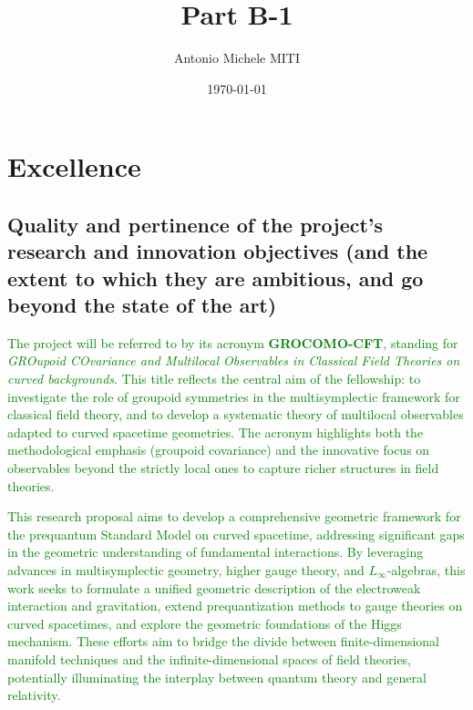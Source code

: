 \documentclass[11pt,draftproposal]{msca-pf}
\title{Part B-1}
\author{Antonio Michele MITI}
\date{\today}
\begin{document}
\maketitle

\section{Excellence }
\label{sc:excellence}


\subsection{Quality and pertinence of the project's research and innovation objectives
    (and the extent to which they are ambitious, and go beyond the state of the art)
    }
\label{ssc:excellence: quality}

\textcolor{green}{The project will be referred to by its acronym \textbf{GROCOMO-CFT}, standing for \emph{GROupoid COvariance and Multilocal Observables in Classical Field Theories on curved backgrounds}. 
This title reflects the central aim of the fellowship: to investigate the role of groupoid symmetries in the multisymplectic framework for classical field theory, and to develop a systematic theory of multilocal observables
adapted to curved spacetime geometries. The acronym highlights both the methodological emphasis (groupoid covariance) and the innovative focus on observables beyond the strictly local ones to capture richer structures in field theories.}

\textcolor{green}{This research proposal aims to develop a comprehensive geometric framework for the prequantum Standard Model on curved spacetime, addressing significant gaps in the geometric understanding of fundamental interactions. By leveraging advances in multisymplectic geometry, higher gauge theory, and $L_\infty$-algebras, this work seeks to formulate a unified geometric description of the electroweak interaction and gravitation, extend prequantization methods to gauge theories on curved spacetimes, and explore the geometric foundations of the Higgs mechanism. These efforts aim to bridge the divide between finite-dimensional manifold techniques and the infinite-dimensional spaces of field theories, potentially illuminating the interplay between quantum theory and general relativity.}
\end{document}
